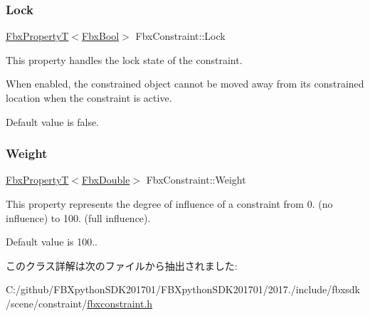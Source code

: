 \subsubsection{\texorpdfstring{Lock}{Lock}}
{\footnotesize\ttfamily \hyperlink{class_fbx_property_t}{Fbx\+PropertyT}$<$\hyperlink{fbxtypes_8h_a92e0562b2fe33e76a242f498b362262e}{Fbx\+Bool}$>$ Fbx\+Constraint\+::\+Lock}

This property handles the lock state of the constraint.

When enabled, the constrained object cannot be moved away from its constrained location when the constraint is active.

Default value is false. \mbox{\label{class_fbx_constraint_ad056a05f11bcd1df8aae65fa6ab941d6}} 
\subsubsection{\texorpdfstring{Weight}{Weight}}
{\footnotesize\ttfamily \hyperlink{class_fbx_property_t}{Fbx\+PropertyT}$<$\hyperlink{fbxtypes_8h_a171e72a1c46fc15c1a6c9c31948c1c5b}{Fbx\+Double}$>$ Fbx\+Constraint\+::\+Weight}

This property represents the degree of influence of a constraint from 0. (no influence) to 100. (full influence).

Default value is 100.. 

このクラス詳解は次のファイルから抽出されました\+:\begin{DoxyCompactItemize}
\item 
C\+:/github/\+F\+B\+Xpython\+S\+D\+K201701/\+F\+B\+Xpython\+S\+D\+K201701/2017./include/fbxsdk/scene/constraint/\hyperlink{fbxconstraint_8h}{fbxconstraint.\+h}\end{DoxyCompactItemize}
